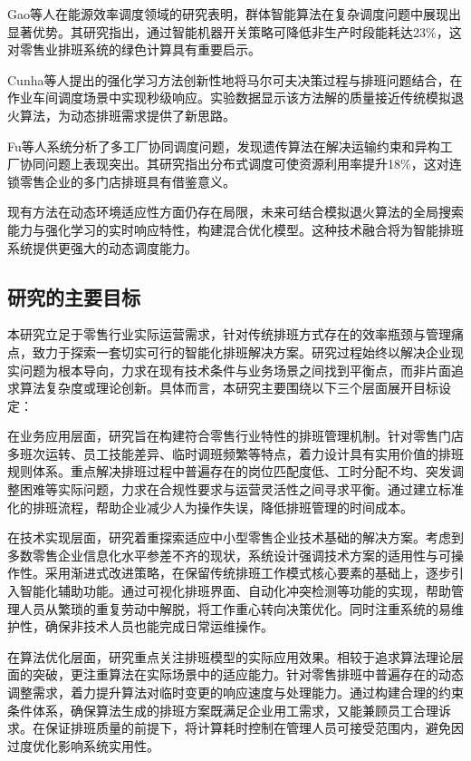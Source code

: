\documentclass{ctexart}
\begin{document}
Gao等人在能源效率调度领域的研究表明，群体智能算法在复杂调度问题中展现出显著优势\cite{Gao2020}。其研究指出，通过智能机器开关策略可降低非生产时段能耗达23\%，这对零售业排班系统的绿色计算具有重要启示。

Cunha等人提出的强化学习方法\cite{app11083710}创新性地将马尔可夫决策过程与排班问题结合，在作业车间调度场景中实现秒级响应。实验数据显示该方法解的质量接近传统模拟退火算法，为动态排班需求提供了新思路。

Fu等人系统分析了多工厂协同调度问题\cite{9409755}，发现遗传算法在解决运输约束和异构工厂协同问题上表现突出。其研究指出分布式调度可使资源利用率提升18\%，这对连锁零售企业的多门店排班具有借鉴意义。

现有方法在动态环境适应性方面仍存在局限，未来可结合模拟退火算法的全局搜索能力与强化学习的实时响应特性，构建混合优化模型。这种技术融合将为智能排班系统提供更强大的动态调度能力。

\subsection{研究的主要目标}

本研究立足于零售行业实际运营需求，针对传统排班方式存在的效率瓶颈与管理痛点，致力于探索一套切实可行的智能化排班解决方案。研究过程始终以解决企业现实问题为根本导向，力求在现有技术条件与业务场景之间找到平衡点，而非片面追求算法复杂度或理论创新。具体而言，本研究主要围绕以下三个层面展开目标设定：

在业务应用层面，研究旨在构建符合零售行业特性的排班管理机制。针对零售门店多班次运转、员工技能差异、临时调班频繁等特点，着力设计具有实用价值的排班规则体系。重点解决排班过程中普遍存在的岗位匹配度低、工时分配不均、突发调整困难等实际问题，力求在合规性要求与运营灵活性之间寻求平衡。通过建立标准化的排班流程，帮助企业减少人为操作失误，降低排班管理的时间成本。

在技术实现层面，研究着重探索适应中小型零售企业技术基础的解决方案。考虑到多数零售企业信息化水平参差不齐的现状，系统设计强调技术方案的适用性与可操作性。采用渐进式改进策略，在保留传统排班工作模式核心要素的基础上，逐步引入智能化辅助功能。通过可视化排班界面、自动化冲突检测等功能的实现，帮助管理人员从繁琐的重复劳动中解脱，将工作重心转向决策优化。同时注重系统的易维护性，确保非技术人员也能完成日常运维操作。

在算法优化层面，研究重点关注排班模型的实际应用效果。相较于追求算法理论层面的突破，更注重算法在实际场景中的适应能力。针对零售排班中普遍存在的动态调整需求，着力提升算法对临时变更的响应速度与处理能力。通过构建合理的约束条件体系，确保算法生成的排班方案既满足企业用工需求，又能兼顾员工合理诉求。在保证排班质量的前提下，将计算耗时控制在管理人员可接受范围内，避免因过度优化影响系统实用性。
\end{document}
